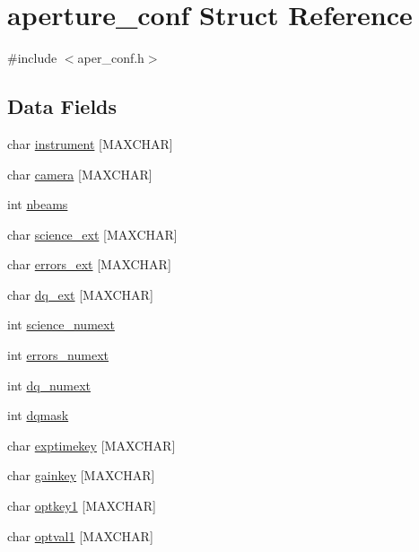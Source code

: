 \hypertarget{structaperture__conf}{
\section{aperture\_\-conf Struct Reference}
\label{structaperture__conf}
}


{\ttfamily \#include $<$aper\_\-conf.h$>$}\subsection*{Data Fields}
\begin{DoxyCompactItemize}
\item 
char \hyperlink{structaperture__conf_ae3db63e0164ca5b8c982df9e74fc90d8}{instrument} \mbox{[}MAXCHAR\mbox{]}
\item 
char \hyperlink{structaperture__conf_a4301fafaf135241f0c8c778a706bdd58}{camera} \mbox{[}MAXCHAR\mbox{]}
\item 
int \hyperlink{structaperture__conf_af53b09fa4f86ff116c002640c3e817d9}{nbeams}
\item 
char \hyperlink{structaperture__conf_adde45d5e583dd6566f7ce226a65a70df}{science\_\-ext} \mbox{[}MAXCHAR\mbox{]}
\item 
char \hyperlink{structaperture__conf_ad0101712c9f239e671e2b4d7f0b64b50}{errors\_\-ext} \mbox{[}MAXCHAR\mbox{]}
\item 
char \hyperlink{structaperture__conf_a66ddf8ad2650f4d22681e58456736c04}{dq\_\-ext} \mbox{[}MAXCHAR\mbox{]}
\item 
int \hyperlink{structaperture__conf_abe36ba97113a8ccb1916acdbe5db113f}{science\_\-numext}
\item 
int \hyperlink{structaperture__conf_a171e464e2539ae4a988ee7c16202b6f2}{errors\_\-numext}
\item 
int \hyperlink{structaperture__conf_ae70427981472e0bcbfbf5726ee9646b1}{dq\_\-numext}
\item 
int \hyperlink{structaperture__conf_a17945ab6b730d7298298e077df799f2c}{dqmask}
\item 
char \hyperlink{structaperture__conf_ac886e8a7c40edc3ab16593effcf4e7fb}{exptimekey} \mbox{[}MAXCHAR\mbox{]}
\item 
char \hyperlink{structaperture__conf_a74a5d41763cd9966b686ba1ff658b80c}{gainkey} \mbox{[}MAXCHAR\mbox{]}
\item 
char \hyperlink{structaperture__conf_a730cc39bb91c34d0dfe92977cb2aaf46}{optkey1} \mbox{[}MAXCHAR\mbox{]}
\item 
char \hyperlink{structaperture__conf_a6b84a9e8edd79d020ea2e189839d86ba}{optval1} \mbox{[}MAXCHAR\mbox{]}

\end{DoxyCompactItemize}
